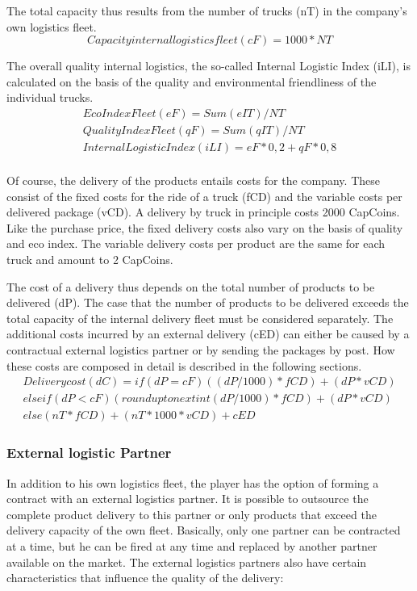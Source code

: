 The total capacity thus results from the number of trucks (nT) in the company's own logistics fleet. 
\begin{equation}
    Capacity internal logistics fleet (cF) = 1000 * NT
\end{equation}

The overall quality internal logistics, the so-called Internal Logistic Index (iLI), is calculated on the basis of the quality and environmental friendliness of the individual trucks.  
\begin{equation}
\begin{aligned}
    Eco Index Fleet (eF) = Sum (eIT) / NT \\
    Quality Index Fleet (qF) = Sum (qIT) / NT \\
    Internal Logistic Index (iLI) = eF * 0,2 + qF * 0,8 \\
\end{aligned}
\end{equation}

Of course, the delivery of the products entails costs for the company. These consist of the fixed costs for the ride of a truck (fCD) and the variable costs per delivered package (vCD). 
A delivery by truck in principle costs 2000 CapCoins. Like the purchase price, the fixed delivery costs also vary on the basis of quality and eco index. The variable delivery costs per product are the same for each truck and amount to 2 CapCoins.

The cost of a delivery thus depends on the total number of products to be delivered (dP). 
The case that the number of products to be delivered exceeds the total capacity of the internal delivery fleet must be considered separately. The additional costs incurred by an external delivery (cED) can either be caused by a contractual external logistics partner or by sending the packages by post. How these costs are composed in detail is described in the following sections. 
\begin{equation}
\begin{aligned}
Delivery cost (dC) = if ( dP = cF ) { (( dP / 1000) * fCD) + ( dP * vCD) } \\
elseif ( dP < cF ) { (round up to next int ( dP / 1000) * fCD ) + ( dP * vCD) } \\
else { ( nT * fCD ) + ( nT *1000 * vCD ) + cED }
\end{aligned}
\end{equation}

\subsubsection{External logistic Partner}
In addition to his own logistics fleet, the player has the option of forming a contract with an external logistics partner. It is possible to outsource the complete product delivery to this partner or only products that exceed the delivery capacity of the own fleet. Basically, only one partner can be contracted at a time, but he can be fired at any time and replaced by another partner available on the market. 
The external logistics partners also have certain characteristics that influence the quality of the delivery: 

